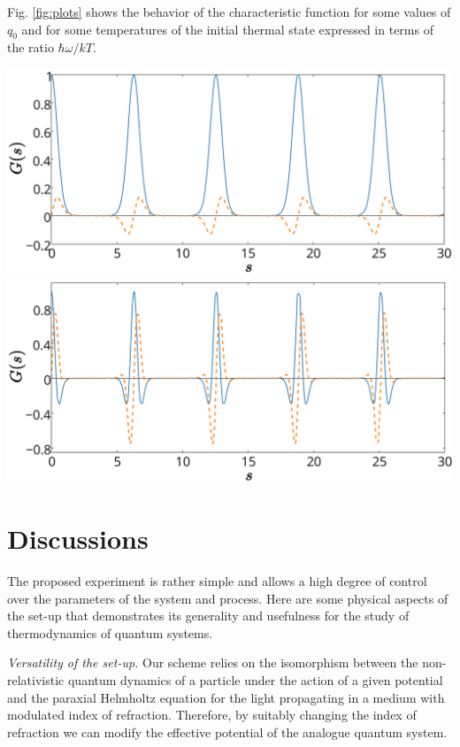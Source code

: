 \documentclass[a0,portrait]{a0poster}
\begin{document}
\begin{multicols}{2}
Fig. \ref{fig:plots} shows the behavior of the characteristic function for some values of $q_0$ and for some temperatures of the initial thermal state expressed in terms of the ratio $\hbar\omega/kT$.
\begin{center}\vspace{1cm}
\includegraphics[width=0.45\linewidth]{Char_01}\hspace{1cm}\includegraphics[width=0.45\linewidth]{Char_03}
\label{fig:plots}
\end{center}\vspace{1cm}

\section*{Discussions}

The proposed experiment is rather simple and allows a high degree of control over the parameters of the system and process. Here are some physical aspects of the set-up that demonstrates its generality and usefulness for the study of thermodynamics of quantum systems.

{\em Versatility of the set-up.} Our scheme relies on the isomorphism between the non-relativistic quantum dynamics of a particle under the action of a given potential and the paraxial Helmholtz equation for the light propagating in a medium with modulated index of refraction. Therefore, by suitably changing the index of refraction we can modify the effective potential of the analogue quantum system.


\end{multicols}
\end{document}
